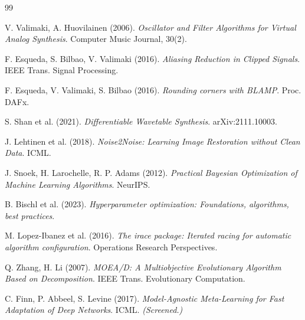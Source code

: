 \documentclass[11pt,a4paper]{article}
\begin{document}
\begin{thebibliography}{99}

 V. Valimaki, A. Huovilainen (2006). \emph{Oscillator and Filter Algorithms for Virtual Analog Synthesis}. Computer Music Journal, 30(2).

 F. Esqueda, S. Bilbao, V. Valimaki (2016). \emph{Aliasing Reduction in Clipped Signals}. IEEE Trans. Signal Processing.

 F. Esqueda, V. Valimaki, S. Bilbao (2016). \emph{Rounding corners with BLAMP}. Proc. DAFx.

 S. Shan et al. (2021). \emph{Differentiable Wavetable Synthesis}. arXiv:2111.10003.

 J. Lehtinen et al. (2018). \emph{Noise2Noise: Learning Image Restoration without Clean Data}. ICML.

 J. Snoek, H. Larochelle, R. P. Adams (2012). \emph{Practical Bayesian Optimization of Machine Learning Algorithms}. NeurIPS.

 B. Bischl et al. (2023). \emph{Hyperparameter optimization: Foundations, algorithms, best practices}.

 M. Lopez-Ibanez et al. (2016). \emph{The irace package: Iterated racing for automatic algorithm configuration}. Operations Research Perspectives.

 Q. Zhang, H. Li (2007). \emph{MOEA/D: A Multiobjective Evolutionary Algorithm Based on Decomposition}. IEEE Trans. Evolutionary Computation.

 C. Finn, P. Abbeel, S. Levine (2017). \emph{Model-Agnostic Meta-Learning for Fast Adaptation of Deep Networks}. ICML. \textit{(Screened.)}

\end{thebibliography}
\end{document}
